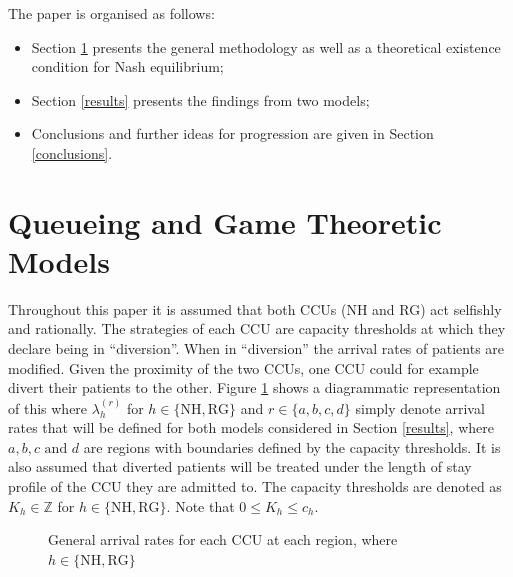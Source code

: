\documentclass{article}
\newcommand{\NH}{\text{NH}}
\newcommand{\RG}{\text{RG}}
\begin{document}
The paper is organised as follows:
\begin{itemize}
    \item Section \ref{queueingandgamemodels} presents the general methodology as well as a theoretical existence condition for Nash equilibrium;
    \item Section \ref{results} presents the findings from two models;
    \item Conclusions and further ideas for progression are given in Section \ref{conclusions}.
\end{itemize}

\section{Queueing and Game Theoretic Models} \label{queueingandgamemodels}

Throughout this paper it is assumed that both CCUs (NH and RG) act selfishly and rationally.
The strategies of each CCU are capacity thresholds at which they declare being in ``diversion''. When in ``diversion'' the arrival rates of patients are modified.
Given the proximity of the two CCUs, one CCU could for example divert their patients to the other.
Figure \ref{arrivalrateregions} shows a diagrammatic representation of this where $\lambda_h^{(r)}$ for $h\in\{\NH, \RG\}$ and $r\in\{a, b, c, d\}$ simply denote arrival rates that will be defined for both models considered in Section \ref{results}, where $a,b,c \text{ and } d$ are regions with boundaries defined by the capacity thresholds.
It is also assumed that diverted patients will be treated under the length of stay profile of the CCU they are admitted to.
The capacity thresholds are denoted as $K_{h}\in\mathbb{Z}$ for $h\in\{\NH,\RG\}$. Note that $0\leq K_h\leq c_h$.

\begin{figure}[!htbp]
\begin{center}
\caption{General arrival rates for each CCU at each region, where $h\in\{\NH, \RG\}$} \label{arrivalrateregions}
\end{center}
\end{figure}
\end{document}
